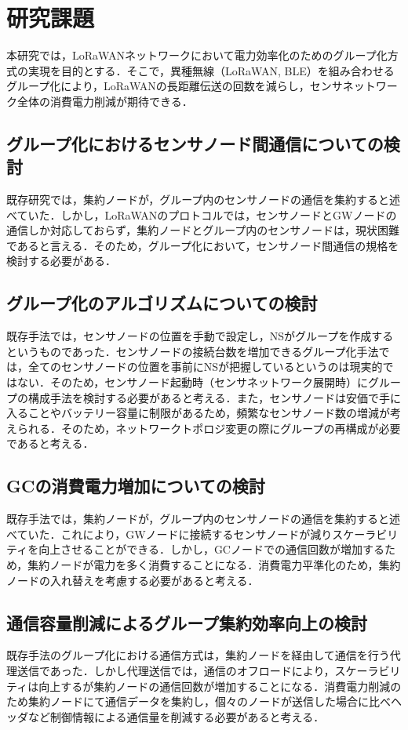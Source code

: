 \chapter{研究課題}
本研究では，LoRaWANネットワークにおいて電力効率化のためのグループ化方式の実現を目的とする．そこで，異種無線（LoRaWAN, BLE）を組み合わせるグループ化により，LoRaWANの長距離伝送の回数を減らし，センサネットワーク全体の消費電力削減が期待できる．

\section{グループ化におけるセンサノード間通信についての検討}
既存研究\cite{Obana2018}では，集約ノードが，グループ内のセンサノードの通信を集約すると述べていた．しかし，LoRaWANのプロトコルでは，センサノードとGWノードの通信しか対応しておらず，集約ノードとグループ内のセンサノードは，現状困難であると言える．そのため，グループ化において，センサノード間通信の規格を検討する必要がある．

\section{グループ化のアルゴリズムについての検討}
既存手法\cite{Obana2018}では，センサノードの位置を手動で設定し，NSがグループを作成するというものであった．センサノードの接続台数を増加できるグループ化手法では，全てのセンサノードの位置を事前にNSが把握しているというのは現実的ではない．そのため，センサノード起動時（センサネットワーク展開時）にグループの構成手法を検討する必要があると考える．また，センサノードは安価で手に入ることやバッテリー容量に制限があるため，頻繁なセンサノード数の増減が考えられる．そのため，ネットワークトポロジ変更の際にグループの再構成が必要であると考える．

\section{GCの消費電力増加についての検討}
既存手法\cite{Obana2018}では，集約ノードが，グループ内のセンサノードの通信を集約すると述べていた．これにより，GWノードに接続するセンサノードが減りスケーラビリティを向上させることができる．しかし，GCノードでの通信回数が増加するため，集約ノードが電力を多く消費することになる．消費電力平準化のため，集約ノードの入れ替えを考慮する必要があると考える．

\section{通信容量削減によるグループ集約効率向上の検討}
既存手法\cite{Obana2018}のグループ化における通信方式は，集約ノードを経由して通信を行う代理送信であった．しかし代理送信では，通信のオフロードにより，スケーラビリティは向上するが集約ノードの通信回数が増加することになる．消費電力削減のため集約ノードにて通信データを集約し，個々のノードが送信した場合に比べヘッダなど制御情報による通信量を削減する必要があると考える．

